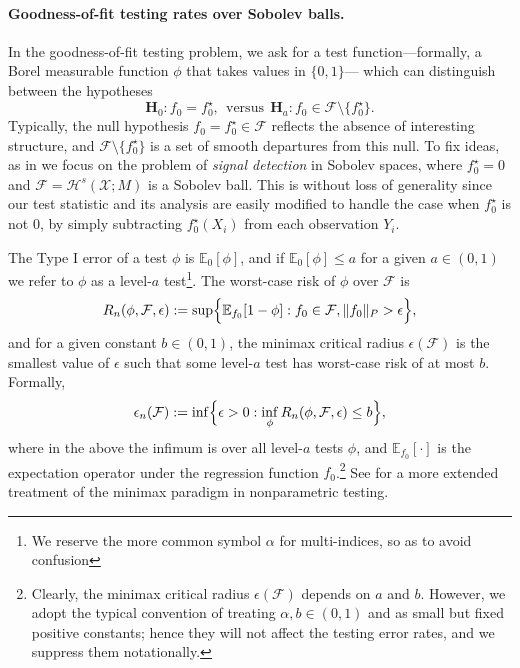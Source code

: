 \documentclass{article}
\newcommand{\1}{\mathbf{1}}
\newcommand{\mc}[1]{\mathcal{#1}}
\newcommand{\Ebb}{\mathbb{E}}
\theoremstyle{alden}
\theoremstyle{aldenthm}
\theoremstyle{definition}
\theoremstyle{remark}
\begin{document}
\paragraph{Goodness-of-fit testing rates over Sobolev balls.}
In the goodness-of-fit testing problem, we ask for a test function---formally, a Borel measurable function $\phi$ that takes values in $\{0,1\}$--- which can distinguish between the hypotheses
\begin{equation}
\mathbf{H}_0: f_0 = f_0^{\star}, ~~\textrm{versus}~~ \mathbf{H}_a: f_0 \in \mc{F} \setminus \{f_0^{\star}\}.
\end{equation} 
Typically, the null hypothesis $f_0 = f_0^{\star} \in \mc{F}$ reflects the absence of interesting structure, and $\mc{F} \setminus  \{f_0^{\star}\}$ is a set of smooth departures from this null. To fix ideas, as in \citet{ingster2009} we focus on the problem of \emph{signal detection} in Sobolev spaces, where $f_0^{\star} = 0$ and $\mc{F} = \mc{H}^s(\mc{X};M)$ is a Sobolev ball. This is without loss of generality since our test statistic and its analysis are easily modified to handle the case when $f_0^{\star}$ is not $0$, by simply subtracting $f_0^{\star}(X_i)$ from each observation $Y_i$.

The Type I error of a test $\phi$ is $\mathbb{E}_0[\phi]$, and if $\mathbb{E}_0[\phi] \leq a$ for a given $a \in (0,1)$ we refer to $\phi$ as a level-$a$ test\footnote{We reserve the more common symbol $\alpha$ for multi-indices, so as to avoid confusion}. The worst-case risk of $\phi$ over $\mc{F}$ is
\begin{equation*}
R_n(\phi, \mc{F}, \epsilon) := \sup\Bigl\{\mathbb{E}_{f_0}[1 - \phi]: f_0 \in \mc{F}, \|f_0\|_{P} > \epsilon\Bigr\},
\end{equation*}
and for a given constant $b \in (0,1)$, the minimax critical radius $\epsilon(\mc{F})$ is the smallest value of $\epsilon$ such that some level-$a$ test has worst-case risk of at most $b$. Formally,
\begin{equation*}
\epsilon_n(\mc{F}) := \inf\Bigl\{\epsilon > 0: \inf_{\phi} R_n(\phi,\mc{F},\epsilon) \leq b \Bigr\},
\end{equation*} 
where in the above the infimum is over all level-$a$ tests $\phi$, and $\Ebb_{f_0}[\cdot]$ is the expectation operator under the regression function $f_0$.\footnote{Clearly, the minimax critical radius $\epsilon(\mc{F})$ depends on $a$ and $b$. However, we adopt the typical convention of treating $\alpha,b \in (0,1)$ and  as small but fixed positive constants; hence they will not affect the testing error rates, and we suppress them notationally.} See \citet{ingster82,ingster87,ingster2012} for a more extended treatment of the minimax paradigm in nonparametric testing. 
\end{document}
